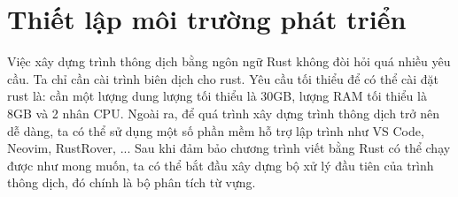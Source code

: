 \section{Thiết lập môi trường phát triển}

Việc xây dựng trình thông dịch bằng ngôn ngữ Rust không đòi hỏi quá nhiều yêu cầu. Ta chỉ cần cài trình biên dịch cho rust. Yêu cầu tối thiểu để có thể cài đặt rust là: cần một lượng dung lượng tối thiểu là 30GB, lượng RAM tối thiểu là 8GB và 2 nhân CPU. Ngoài ra, để quá trình xây dựng trình thông dịch trở nên dễ dàng, ta có thể sử dụng một số phần mềm hỗ trợ lập trình như VS Code, Neovim, RustRover, ... Sau khi đảm bảo chương trình viết bằng Rust có thể chạy được như mong muốn, ta có thể bắt đầu xây dựng bộ xử lý đầu tiên của trình thông dịch, đó chính là bộ phân tích từ vựng.
